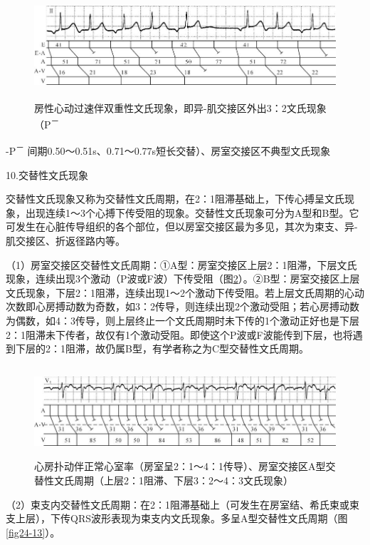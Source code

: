 \begin{figure}[!htbp]
 \centering
 \includegraphics[width=5.83333in,height=1.53125in]{./images/Image00313.jpg}
 \captionsetup{justification=centering}
 \caption{房性心动过速伴双重性文氏现象，即异-肌交接区外出3：2文氏现象（P\textsuperscript{－}}
 \label{fig18-12}
  \end{figure} 
-P\textsuperscript{－}
间期0.50～0.51s、0.71～0.77s短长交替）、房室交接区不典型文氏现象

10.交替性文氏现象

交替性文氏现象又称为交替性文氏周期，在2：1阻滞基础上，下传心搏呈文氏现象，出现连续1～3个心搏下传受阻的现象。交替性文氏现象可分为A型和B型。它可发生在心脏传导组织的各个部位，但以房室交接区最为多见，其次为束支、异-肌交接区、折返径路内等。

（1）房室交接区交替性文氏周期：①A型：房室交接区上层2：1阻滞，下层文氏现象，连续出现3个激动（P波或F波）下传受阻（图\ref{fig18-13}）。②B型：房室交接区上层文氏现象，下层2：1阻滞，连续出现1～2个激动下传受阻。若上层文氏周期的心动次数即心房搏动数为奇数，如3：2传导，则连续出现2个激动受阻；若心房搏动数为偶数，如4：3传导，则上层终止一个文氏周期时未下传的1个激动正好也是下层2：1阻滞未下传者，故仅有1个激动受阻。即使这个P波或F波能传到下层，也将遇到下层的2：1阻滞，故仍属B型，有学者称之为C型交替性文氏周期。

\begin{figure}[!htbp]
 \centering
 \includegraphics[width=5.77083in,height=1.32292in]{./images/Image00314.jpg}
 \captionsetup{justification=centering}
 \caption{心房扑动伴正常心室率（房室呈2：1～4：1传导）、房室交接区A型交替性文氏周期（上层2：1阻滞、下层3：2～4：3文氏现象）}
 \label{fig18-13}
  \end{figure} 

（2）束支内交替性文氏周期：在2：1阻滞基础上（可发生在房室结、希氏束或束支上层），下传QRS波形表现为束支内文氏现象。多呈A型交替性文氏周期（图\ref{fig24-13}）。

